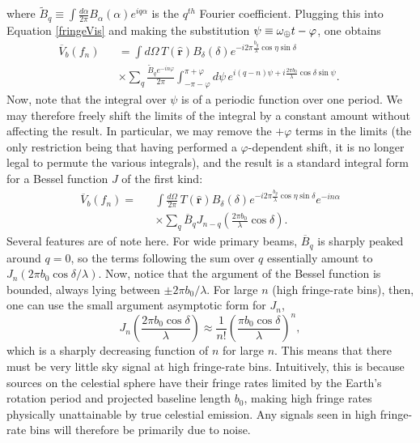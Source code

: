 \documentclass[twocolumn,apj,numberedappendix]{emulateapj}
\newcommand{\rhat}{\hat{\mathbf{r}}}
\begin{document}
where $\widetilde{B}_q \equiv \int \frac{d\alpha}{2\pi} B_\alpha(\alpha)
e^{i q\alpha}$ is the $q^{th}$ Fourier coefficient.  Plugging this into
Equation \eqref{fringeVis} and making the substitution $\psi \equiv
\omega_\oplus t - \varphi$, one obtains
\begin{eqnarray}
\overline{V}_b (f_n) &&= \int d\Omega \, T(\rhat) B_\delta (\delta) e^{-i 2 \pi  \frac{b_y}{\lambda} \cos \eta \sin \delta} \nonumber \\
&& \times \sum_q \frac{\widetilde{B}_q e^{-i n \varphi}}{2 \pi} \int_{-\pi -\varphi}^{\pi+\varphi} d\psi \, e^{i (q-n) \psi +i \frac{2 \pi b_0}{\lambda} \cos \delta \sin \psi}. \qquad
\end{eqnarray}
Now, note that the integral over $\psi$ is of a periodic function over one
period.  We may therefore freely shift the limits of the integral by a constant
amount without affecting the result.  In particular, we may remove the
$+\varphi$ terms in the limits (the only restriction being that having performed a $\varphi$-dependent shift, it is no longer legal to permute the various integrals), and
the result is a standard integral form for a Bessel function $J$ of the first
kind:
\begin{eqnarray}
\label{fringeBessel}
\overline{V}_b (f_n) =&& \int \frac{d\Omega}{2 \pi}\, T(\rhat) B_\delta (\delta) e^{-i 2 \pi  \frac{b_y}{\lambda} \cos \eta \sin \delta}
e^{-i n \alpha} \nonumber \\ 
&& \times \sum_q \overline{B}_q  J_{n-q} \left( \frac{2 \pi b_0}{\lambda} \cos \delta \right).
\end{eqnarray}
Several features are of note here.  For wide primary beams, $\overline{B}_q$
is sharply peaked around $q=0$, so the terms following the sum over $q$
essentially amount to $J_n ( 2 \pi b_0 \cos \delta / \lambda )$.  Now, notice
that the argument of the Bessel function is bounded, always lying between $\pm
2\pi b_0/ \lambda$.  For large $n$ (high fringe-rate bins), then, one can use
the small argument asymptotic form for $J_n$,\begin{equation}
J_n \left( \frac{2 \pi b_0 \cos \delta}{ \lambda} \right) \approx \frac{1}{n!} \left( \frac{ \pi b_0 \cos \delta}{ \lambda} \right)^n,
\end{equation}
which is a sharply decreasing function of $n$ for large $n$.  This means that
there must be very little sky signal at high fringe-rate bins.  Intuitively,
this is because sources on the celestial sphere have their fringe rates limited
by the Earth's rotation period and projected baseline length $b_0$, making high
fringe rates physically unattainable by true celestial emission.  Any signals
seen in high fringe-rate bins will therefore be primarily due to noise.
\end{document}
